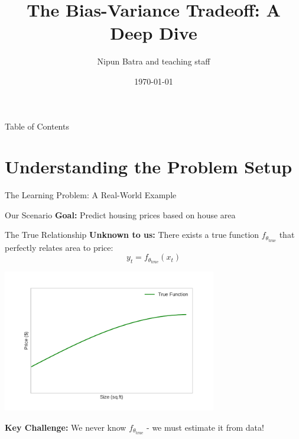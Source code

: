 \documentclass[10pt]{beamer}
\title{The Bias-Variance Tradeoff: A Deep Dive}
\date{\today}
\author{Nipun Batra and teaching staff}
\institute{IIT Gandhinagar}
\newcommand{\fitpic}[1]{\begin{adjustbox}{max width=\linewidth, max totalheight=0.78\textheight}#1\end{adjustbox}}
\begin{document}
\maketitle

\begin{frame}{Table of Contents}
\tableofcontents
\end{frame}

\section{Understanding the Problem Setup}

\begin{frame}{The Learning Problem: A Real-World Example}
\begin{definitionbox}{Our Scenario}
\textbf{Goal:} Predict housing prices based on house area
\end{definitionbox}

\begin{examplebox}{The True Relationship}
\textbf{Unknown to us:} There exists a true function $f_{\theta_{\text{true}}}$ that perfectly relates area to price:
$$y_t = f_{\theta_{\text{true}}}(x_t)$$
\end{examplebox}

\begin{center}
\fitpic{\includegraphics[width=0.7\textwidth]{../assets/bias-variance/figures/true.pdf}}
\end{center}

\begin{keypointsbox}
\textbf{Key Challenge:} We never know $f_{\theta_{\text{true}}}$ - we must estimate it from data!
\end{keypointsbox}
\end{frame}
\end{document}
